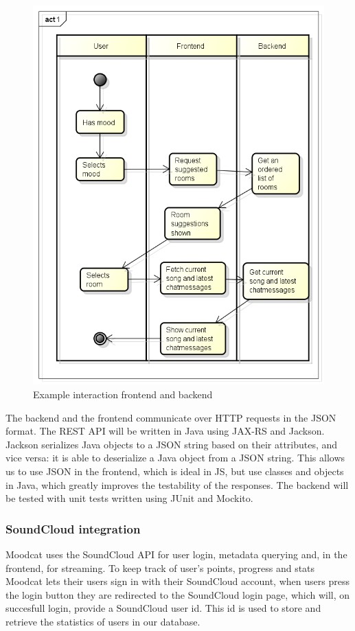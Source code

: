 \begin{figure}[H]
\includegraphics[scale=.4]{backendInteraction.png}
\caption{Example interaction frontend and backend}
\label{fig: backendInteraction}
\end{figure}


\par
The backend and the frontend communicate over \Gls{HTTP} requests in the \Gls{JSON} format.
The REST API will be written in Java using JAX-RS and Jackson.
Jackson serializes Java objects to a JSON string based on their attributes, and vice versa: it is able to deserialize a Java object from a JSON string.
This allows us to use JSON in the frontend, which is ideal in \Gls{JS}, but use classes and objects in Java, which greatly improves the testability of the responses.
The backend will be tested with unit tests written using JUnit and Mockito.

\subsubsection{SoundCloud integration}
Moodcat uses the SoundCloud API for user login, metadata querying and, in the frontend, for streaming.
To keep track of user's points, progress and stats Moodcat lets their users sign in with their SoundCloud account,
when users press the login button they are redirected to the SoundCloud login page, which will, on succesfull login,
provide a SoundCloud user id. This id is used to store and retrieve the statistics of users in our database.

